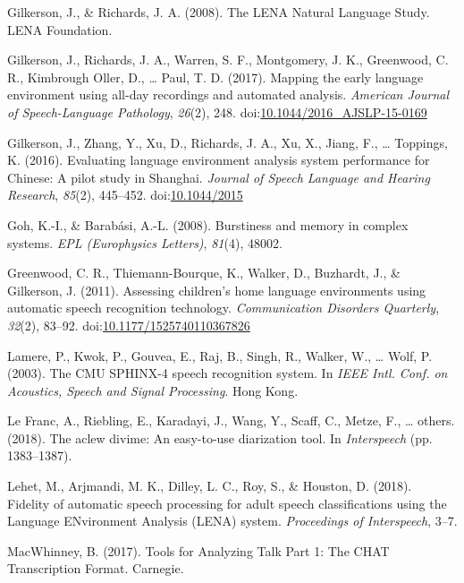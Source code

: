\documentclass[english,floatsintext,man]{apa6}
\begin{document}
\hypertarget{ref-gilkerson2008lena}{}
Gilkerson, J., \& Richards, J. A. (2008). The LENA Natural Language
Study. LENA Foundation.

\hypertarget{ref-Gilkerson2017}{}
Gilkerson, J., Richards, J. A., Warren, S. F., Montgomery, J. K.,
Greenwood, C. R., Kimbrough Oller, D., \ldots{} Paul, T. D. (2017).
Mapping the early language environment using all-day recordings and
automated analysis. \emph{American Journal of Speech-Language
Pathology}, \emph{26}(2), 248.
doi:\href{https://doi.org/10.1044/2016_AJSLP-15-0169}{10.1044/2016\_AJSLP-15-0169}

\hypertarget{ref-Gilkerson2016}{}
Gilkerson, J., Zhang, Y., Xu, D., Richards, J. A., Xu, X., Jiang, F.,
\ldots{} Toppings, K. (2016). Evaluating language environment analysis
system performance for Chinese: A pilot study in Shanghai. \emph{Journal
of Speech Language and Hearing Research}, \emph{85}(2), 445--452.
doi:\href{https://doi.org/10.1044/2015}{10.1044/2015}

\hypertarget{ref-goh2008burstiness}{}
Goh, K.-I., \& Barabási, A.-L. (2008). Burstiness and memory in complex
systems. \emph{EPL (Europhysics Letters)}, \emph{81}(4), 48002.

\hypertarget{ref-Greenwood2011}{}
Greenwood, C. R., Thiemann-Bourque, K., Walker, D., Buzhardt, J., \&
Gilkerson, J. (2011). Assessing children's home language environments
using automatic speech recognition technology. \emph{Communication
Disorders Quarterly}, \emph{32}(2), 83--92.
doi:\href{https://doi.org/10.1177/1525740110367826}{10.1177/1525740110367826}

\hypertarget{ref-lamere2003cmu}{}
Lamere, P., Kwok, P., Gouvea, E., Raj, B., Singh, R., Walker, W.,
\ldots{} Wolf, P. (2003). The CMU SPHINX-4 speech recognition system. In
\emph{IEEE Intl. Conf. on Acoustics, Speech and Signal Processing}. Hong
Kong.

\hypertarget{ref-le2018aclew}{}
Le Franc, A., Riebling, E., Karadayi, J., Wang, Y., Scaff, C., Metze,
F., \ldots{} others. (2018). The aclew divime: An easy-to-use
diarization tool. In \emph{Interspeech} (pp. 1383--1387).

\hypertarget{ref-Lehet2018}{}
Lehet, M., Arjmandi, M. K., Dilley, L. C., Roy, S., \& Houston, D.
(2018). Fidelity of automatic speech processing for adult speech
classifications using the Language ENvironment Analysis (LENA) system.
\emph{Proceedings of Interspeech}, 3--7.

\hypertarget{ref-macwhinney2017tools}{}
MacWhinney, B. (2017). Tools for Analyzing Talk Part 1: The CHAT
Transcription Format. Carnegie.
\end{document}
